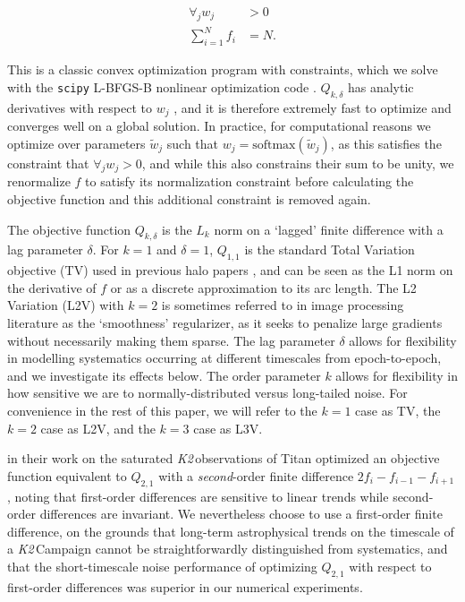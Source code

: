 \documentclass[modern]{aastex62}
\newcommand\ktwo{\emph{K2}\,}
\begin{document}
\begin{align}
\forall_j w_j &> 0\\
\sum_{i=1}^{N} f_i  &= N.
\end{align}

This is a classic convex optimization program with constraints, which we solve with the \texttt{scipy} \citep{scipy} L-BFGS-B nonlinear optimization code \citep{lbfgsb}. $Q_{k,\delta}$ has analytic derivatives with respect to $w_j$ \citep[calculated with \texttt{autograd};][]{autograd}, and it is therefore extremely fast to optimize and converges well on a global solution. In practice, for computational reasons we optimize over parameters $\tilde{w}_j$ such that $w_j = \text{softmax}(\tilde{w}_j)$, as this satisfies the constraint that $\forall_j w_j > 0$, and while this also constrains their sum to be unity, we renormalize $f$ to satisfy its normalization constraint before calculating the objective function and this additional constraint is removed again.

The objective function $Q_{k,\delta}$ is the $L_k$ norm on a `lagged' finite difference with a lag parameter $\delta$. For $k = 1$ and $\delta = 1$, $Q_{1,1}$ is the standard Total Variation objective (TV) used in previous halo papers \citep[e.g.][]{White2017,Farr2018}, and can be seen as the L1 norm on the derivative of $f$ or as a discrete approximation to its arc length. The L2 Variation (L2V) with $k=2$ is sometimes referred to in image processing literature as the `smoothness' regularizer, as it seeks to penalize large gradients without necessarily making them sparse. The lag parameter $\delta$ allows for flexibility in modelling systematics occurring at different timescales from epoch-to-epoch, and we investigate its effects below. The order parameter $k$ allows for flexibility in how sensitive we are to normally-distributed versus long-tailed noise. For convenience in the rest of this paper, we will refer to the $k=1$ case as TV, the $k=2$ case as L2V, and the $k=3$ case as L3V.

\citet{parker} in their work on the saturated \ktwo observations of Titan optimized an objective function equivalent to $Q_{2,1}$ with a \emph{second}-order finite difference $2f_i -f_{i-1} -f_{i+1}$, noting that first-order differences are sensitive to linear trends while second-order differences are invariant. We nevertheless choose to use a first-order finite difference, on the grounds that long-term astrophysical trends on the timescale of a \ktwo Campaign cannot be straightforwardly distinguished from systematics, and that the short-timescale noise performance of optimizing $Q_{2,1}$ with respect to first-order differences was superior in our numerical experiments. 
\end{document}
